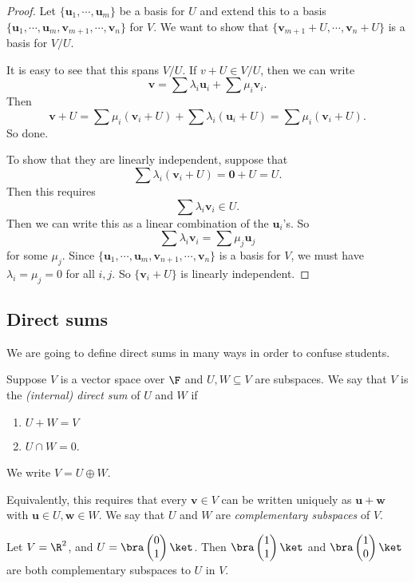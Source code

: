 \documentclass[a4paper]{article}
\begin{document}
\begin{proof}
  Let $\{\mathbf{u}_1, \cdots, \mathbf{u}_m\}$ be a basis for $U$ and extend this to a basis $\{\mathbf{u}_1, \cdots, \mathbf{u}_m,\allowbreak \mathbf{v}_{m + 1}, \cdots, \mathbf{v}_n\}$ for $V$. We want to show that $\{\mathbf{v}_{m + 1} + U, \cdots, \mathbf{v}_n + U\}$ is a basis for $V/U$.

  It is easy to see that this spans $V/U$. If $v + U \in V/U$, then we can write
  \[
    \mathbf{v} = \sum \lambda_i \mathbf{u}_i + \sum \mu_i \mathbf{v}_i.
  \]
  Then
  \[
    \mathbf{v} + U = \sum \mu_i (\mathbf{v}_i + U) + \sum \lambda_i (\mathbf{u}_i + U) = \sum \mu_i (\mathbf{v}_i + U).
  \]
  So done.

  To show that they are linearly independent, suppose that
  \[
    \sum \lambda_i (\mathbf{v}_i + U) = \mathbf{0} + U = U.
  \]
  Then this requires
  \[
    \sum \lambda_i \mathbf{v}_i \in U.
  \]
  Then we can write this as a linear combination of the $\mathbf{u}_i$'s. So
  \[
    \sum \lambda_i \mathbf{v}_i = \sum \mu_j \mathbf{u}_j
  \]
  for some $\mu_j$. Since $\{\mathbf{u}_1, \cdots, \mathbf{u}_m, \mathbf{v}_{n + 1}, \cdots, \mathbf{v}_n\}$ is a basis for $V$, we must have $\lambda_i = \mu_j = 0$ for all $i, j$. So $\{\mathbf{v}_i + U\}$ is linearly independent.
\end{proof}
\subsection{Direct sums}
We are going to define direct sums in many ways in order to confuse students.
\begin{defi}
  Suppose $V$ is a vector space over $\F$ and $U, W\subseteq V$ are subspaces. We say that $V$ is the \emph{(internal) direct sum} of $U$ and $W$ if
  \begin{enumerate}
    \item $U + W = V$
    \item $U \cap W = 0$.
  \end{enumerate}
  We write $V = U\oplus W$.

  Equivalently, this requires that every $\mathbf{v}\in V$ can be written uniquely as $\mathbf{u} + \mathbf{w}$ with $\mathbf{u}\in U, \mathbf{w}\in W$. We say that $U$ and $W$ are \emph{complementary subspaces} of $V$.
\end{defi}

\begin{eg}
  Let $V = \R^2$, and $U = \bra \begin{pmatrix}0\\1\end{pmatrix}\ket$. Then $\bra \begin{pmatrix}1\\1\end{pmatrix}\ket$ and $\bra \begin{pmatrix}1\\0\end{pmatrix}\ket$ are both complementary subspaces to $U$ in $V$.
\end{eg}
\end{document}
